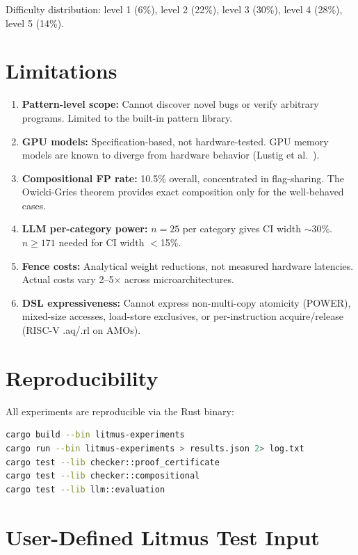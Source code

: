 \documentclass[11pt]{article}
\begin{document}
Difficulty distribution: level 1 (6\%), level 2 (22\%), level 3 (30\%),
level 4 (28\%), level 5 (14\%).

\section{Limitations}
\label{app:limitations}

\begin{enumerate}[nosep]
\item \textbf{Pattern-level scope:} Cannot discover novel bugs or verify
  arbitrary programs. Limited to the built-in pattern library.
\item \textbf{GPU models:} Specification-based, not hardware-tested.
  GPU memory models are known to diverge from hardware behavior
  (Lustig et al.~\cite{Lustig2019}).
\item \textbf{Compositional FP rate:} 10.5\% overall, concentrated in
  flag-sharing. The Owicki-Gries theorem provides exact composition
  only for the well-behaved cases.
\item \textbf{LLM per-category power:} $n=25$ per category gives
  CI width $\sim$30\%. $n \geq 171$ needed for CI width $<$15\%.
\item \textbf{Fence costs:} Analytical weight reductions, not measured
  hardware latencies. Actual costs vary 2--5$\times$ across microarchitectures.
\item \textbf{DSL expressiveness:} Cannot express non-multi-copy atomicity
  (POWER), mixed-size accesses, load-store exclusives, or per-instruction
  acquire/release (RISC-V .aq/.rl on AMOs).
\end{enumerate}

\section{Reproducibility}
\label{app:reproduce}

All experiments are reproducible via the Rust binary:
\begin{lstlisting}[language=bash, numbers=none]
cargo build --bin litmus-experiments
cargo run --bin litmus-experiments > results.json 2> log.txt
cargo test --lib checker::proof_certificate
cargo test --lib checker::compositional
cargo test --lib llm::evaluation
\end{lstlisting}

\section{User-Defined Litmus Test Input}
\label{sec:user-input}
\end{document}
